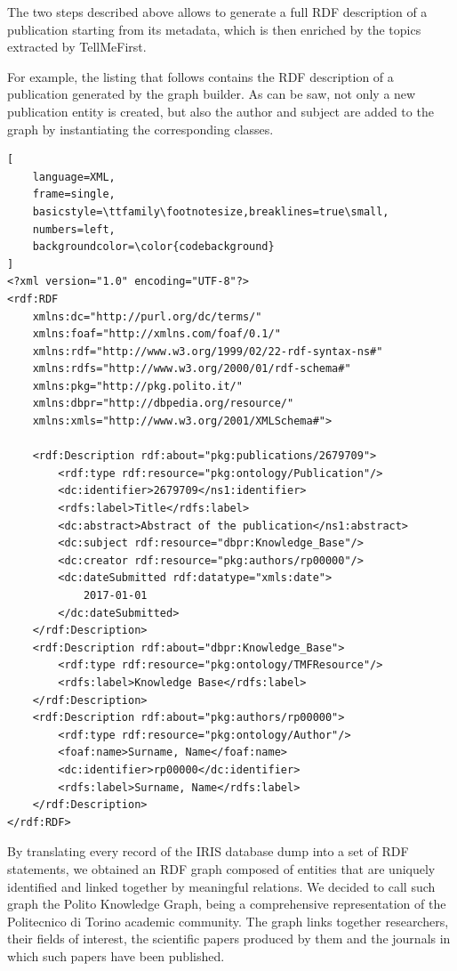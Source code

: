 \documentclass[%
    corpo=13.5pt,
    twoside,
    oldstyle,
    tipotesi=magistrale,
    greek,
    evenboxes
]{toptesi}
\begin{document}
The two steps described above allows to generate a full RDF description of a
publication starting from its metadata, which is then enriched by the topics
extracted by TellMeFirst.

For example, the listing that follows contains the RDF description of a
publication generated by the graph builder. As can be saw, not only a new
publication entity is created, but also the author and subject are
added to the graph by instantiating the corresponding classes.

\begin{lstlisting}[
    language=XML,
    frame=single,
    basicstyle=\ttfamily\footnotesize,breaklines=true\small,
    numbers=left,
    backgroundcolor=\color{codebackground}
]
<?xml version="1.0" encoding="UTF-8"?>
<rdf:RDF
    xmlns:dc="http://purl.org/dc/terms/"
    xmlns:foaf="http://xmlns.com/foaf/0.1/"
    xmlns:rdf="http://www.w3.org/1999/02/22-rdf-syntax-ns#"
    xmlns:rdfs="http://www.w3.org/2000/01/rdf-schema#"
    xmlns:pkg="http://pkg.polito.it/"
    xmlns:dbpr="http://dbpedia.org/resource/"
    xmlns:xmls="http://www.w3.org/2001/XMLSchema#">

    <rdf:Description rdf:about="pkg:publications/2679709">
        <rdf:type rdf:resource="pkg:ontology/Publication"/>
        <dc:identifier>2679709</ns1:identifier>
        <rdfs:label>Title</rdfs:label>
        <dc:abstract>Abstract of the publication</ns1:abstract>
        <dc:subject rdf:resource="dbpr:Knowledge_Base"/>
        <dc:creator rdf:resource="pkg:authors/rp00000"/>
        <dc:dateSubmitted rdf:datatype="xmls:date">
            2017-01-01
        </dc:dateSubmitted>
    </rdf:Description>
    <rdf:Description rdf:about="dbpr:Knowledge_Base">
        <rdf:type rdf:resource="pkg:ontology/TMFResource"/>
        <rdfs:label>Knowledge Base</rdfs:label>
    </rdf:Description>
    <rdf:Description rdf:about="pkg:authors/rp00000">
        <rdf:type rdf:resource="pkg:ontology/Author"/>
        <foaf:name>Surname, Name</foaf:name>
        <dc:identifier>rp00000</dc:identifier>
        <rdfs:label>Surname, Name</rdfs:label>
    </rdf:Description>
</rdf:RDF>
\end{lstlisting}

\newpage

By translating every record of the IRIS database dump into a set of
RDF statements, we obtained an RDF graph composed of entities that are uniquely
identified and linked together by meaningful relations.
We decided to call such graph the Polito Knowledge Graph, being a comprehensive
representation of the Politecnico di Torino academic community.
The graph links together researchers, their fields of interest, the scientific
papers produced by them and the journals in which such papers have been
published.
\end{document}
